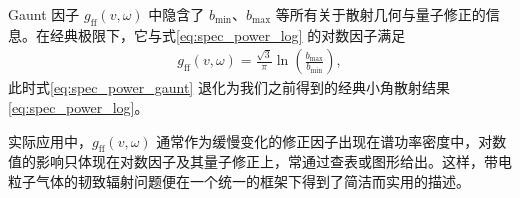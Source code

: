 \documentclass[12pt,oneside]{ctexart}
\theoremstyle{definition}
\theoremstyle{plain}
\theoremstyle{remark}
\begin{document}
Gaunt 因子 $g_{\mathrm{ff}}(v,\omega)$ 中隐含了 $b_{\min}$、$b_{\max}$ 等所有关于散射几何与量子修正的信息。在经典极限下，它与式\eqref{eq:spec_power_log} 的对数因子满足
\begin{align}
  g_{\mathrm{ff}}(v,\omega)
  = \frac{\sqrt{3}}{\pi}
    \ln\!\left(\frac{b_{\max}}{b_{\min}}\right),
  \label{eq:gaunt_classical}
\end{align}
此时式\eqref{eq:spec_power_gaunt} 退化为我们之前得到的经典小角散射结果\eqref{eq:spec_power_log}。

实际应用中，$g_{\mathrm{ff}}(v,\omega)$ 通常作为缓慢变化的修正因子出现在谱功率密度中，对数值的影响只体现在对数因子及其量子修正上，常通过查表或图形给出。这样，带电粒子气体的韧致辐射问题便在一个统一的框架下得到了简洁而实用的描述。
\end{document}
